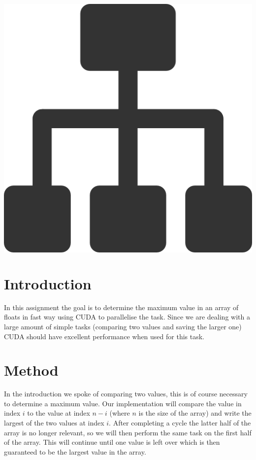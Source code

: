\documentclass[a4paper,12px]{article}
\begin{document}
\vspace{2cm}
\begin{center}
    \includegraphics[width=(\textwidth/5*3)]{parallel_tasks}
\end{center}
\clearpage

\tableofcontents
\vspace{5mm}


\section{Introduction}

In this assignment the goal is to determine the maximum value in an array of
floats in fast way using CUDA to parallelise the task. Since we are dealing with
a large amount of simple tasks (comparing two values and saving the larger one)
CUDA should have excellent performance when used for this task.

\section{Method}

In the introduction we spoke of comparing two values, this is of course
necessary to determine a maximum value. Our implementation will compare the
value in index $i$ to the value at index $n-i$ (where $n$ is the size of the
array) and write the largest of the two values at index $i$. After completing
a cycle the latter half of the array is no longer relevant, so we will then
perform the same task on the first half of the array. This will continue until
one value is left over which is then guaranteed to be the largest value in the
array.
\end{document}
